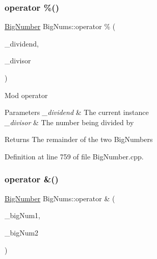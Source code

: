\mbox{\label{namespace_big_nums_ae7b3fba15d931353b415566997ad2bd2}} 
\subsubsection{\texorpdfstring{operator \%()}{operator \%()}}
{\footnotesize\ttfamily \mbox{\hyperlink{class_big_nums_1_1_big_number}{Big\+Number}} Big\+Nums\+::operator \% (\begin{DoxyParamCaption}\item[{\mbox{\hyperlink{class_big_nums_1_1_big_number}{Big\+Number}}}]{\+\_\+dividend,  }\item[{const \mbox{\hyperlink{class_big_nums_1_1_big_number}{Big\+Number}} \&}]{\+\_\+divisor }\end{DoxyParamCaption})}

Mod operator 
\begin{DoxyParams}{Parameters}
{\em \+\_\+dividend} & The current instance \\
\hline
{\em \+\_\+divisor} & The number being divided by \\
\hline
\end{DoxyParams}
\begin{DoxyReturn}{Returns}
The remainder of the two Big\+Numbers 
\end{DoxyReturn}


Definition at line 759 of file Big\+Number.\+cpp.

\mbox{\label{namespace_big_nums_ab5839eac3b74ef69240811d21f09377c}} 
\subsubsection{\texorpdfstring{operator \&()}{operator \&()}}
{\footnotesize\ttfamily \mbox{\hyperlink{class_big_nums_1_1_big_number}{Big\+Number}} Big\+Nums\+::operator \& (\begin{DoxyParamCaption}\item[{const \mbox{\hyperlink{class_big_nums_1_1_big_number}{Big\+Number}} \&}]{\+\_\+big\+Num1,  }\item[{const \mbox{\hyperlink{class_big_nums_1_1_big_number}{Big\+Number}} \&}]{\+\_\+big\+Num2 }\end{DoxyParamCaption})}

